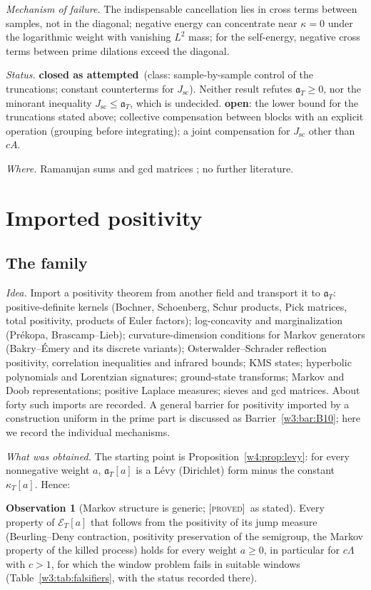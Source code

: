 \documentclass[11pt]{amsart}
\theoremstyle{definition}
\newtheorem{observation}[theorem]{Observation}
\theoremstyle{remark}
\numberwithin{equation}{section}
\newcommand{\aT}{\mathfrak{a}_T}                       %
\newcommand{\stag}[1]{\textsc{[#1]}}
\newcommand{\PROVED}{\stag{proved}}
\newcommand{\rtag}[1]{\textbf{\small\textsf{#1}}}
\newcommand{\closedA}{\rtag{closed as attempted}}
\newcommand{\openR}{\rtag{open}}
\newcommand{\entry}[1]{\par\smallskip\noindent\textit{#1.}\enspace}
\begin{document}
\entry{Mechanism of failure} The indispensable cancellation lies in cross terms between samples, not in the diagonal; negative energy can
concentrate near $\kappa=0$ under the logarithmic weight with vanishing $L^2$ mass; for the self-energy, negative cross terms between prime
dilations exceed the diagonal.

\entry{Status} \closedA\ (class: sample-by-sample control of the truncations; constant counterterms for $J_{\mathrm{sc}}$). Neither result refutes
$\aT\ge0$, nor the minorant inequality $J_{\mathrm{sc}}\le\aT$, which is undecided. \openR: the lower bound for the truncations stated above;
collective compensation between blocks with an explicit operation (grouping before integrating); a joint compensation for $J_{\mathrm{sc}}$
other than $cA$.

\entry{Where} Ramanujan sums and gcd matrices \cite{Smith1876}; no further literature.


\section{Imported positivity}\label{w4:sec:imported}

\subsection{The family}\label{w4:fam:R6}

\entry{Idea} Import a positivity theorem from another field and transport it to $\aT$: positive-definite kernels (Bochner,
Schoenberg, Schur products, Pick matrices, total positivity, products of Euler factors); log-concavity and marginalization
(Pr\'ekopa, Brascamp--Lieb); curvature-dimension conditions for Markov generators (Bakry--\'Emery and its discrete variants);
Osterwalder--Schrader reflection positivity, correlation inequalities and infrared bounds; KMS states; hyperbolic polynomials and
Lorentzian signatures; ground-state transforms; Markov and Doob representations; positive Laplace measures; sieves and gcd matrices.
About forty such imports are recorded. A general barrier for positivity imported by a construction uniform in the prime part is
discussed as Barrier~\ref{w3:bar:B10}; here we record the individual mechanisms.

\entry{What was obtained} The starting point is Proposition~\ref{w4:prop:levy}: for every nonnegative weight $a$, $\aT[a]$ is a
L\'evy (Dirichlet) form minus the constant $\kappa_T[a]$. Hence:

\begin{observation}[Markov structure is generic; \PROVED\ as stated]\label{w4:obs:markov}
Every property of $\mathcal E_T[a]$ that follows from the positivity of its jump measure (Beurling--Deny contraction, positivity
preservation of the semigroup, the Markov property of the killed process) holds for every weight $a\ge0$, in particular for $c\Lambda$
with $c>1$, for which the window problem fails in suitable windows (Table~\ref{w3:tab:falsifiers}, with the status recorded there).
\end{observation}
\end{document}
